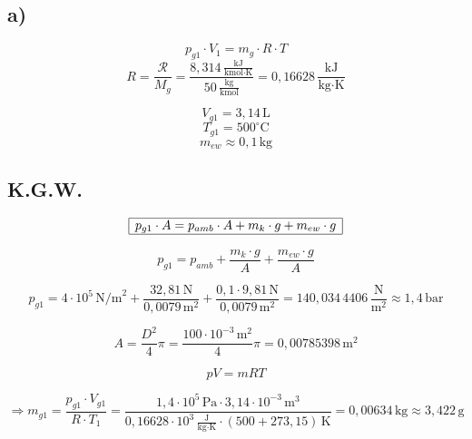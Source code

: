 

\subsection*{a)}
\[
p_{g1} \cdot V_1 = m_g \cdot R \cdot T
\]
\[
R = \frac{\mathcal{R}}{M_g} = \frac{8{,}314 \, \frac{\text{kJ}}{\text{kmol} \cdot \text{K}}}{50 \, \frac{\text{kg}}{\text{kmol}}} = 0{,}16628 \, \frac{\text{kJ}}{\text{kg} \cdot \text{K}}
\]

\[
V_{g1} = 3{,}14 \, \text{L}
\]
\[
T_{g1} = 500^\circ \text{C}
\]
\[
m_{ew} \approx 0{,}1 \, \text{kg}
\]

\subsection*{K.G.W.}
\[
\begin{array}{|c|}
\hline
p_{g1} \cdot A = p_{amb} \cdot A + m_k \cdot g + m_{ew} \cdot g \\
\hline
\end{array}
\]

\[
p_{g1} = p_{amb} + \frac{m_k \cdot g}{A} + \frac{m_{ew} \cdot g}{A}
\]

\[
p_{g1} = 4 \cdot 10^5 \, \text{N/m}^2 + \frac{32{,}81 \, \text{N}}{0{,}0079 \, \text{m}^2} + \frac{0{,}1 \cdot 9{,}81 \, \text{N}}{0{,}0079 \, \text{m}^2} = 140{,}034 \, 4406 \, \frac{\text{N}}{\text{m}^2} \approx 1{,}4 \, \text{bar}
\]

\[
A = \frac{D^2}{4} \pi = \frac{100 \cdot 10^{-3} \, \text{m}^2}{4} \pi = 0{,}00785398 \, \text{m}^2
\]

\[
pV = mRT
\]

\[
\Rightarrow m_{g1} = \frac{p_{g1} \cdot V_{g1}}{R \cdot T_1} = \frac{1{,}4 \cdot 10^5 \, \text{Pa} \cdot 3{,}14 \cdot 10^{-3} \, \text{m}^3}{0{,}16628 \cdot 10^3 \, \frac{\text{J}}{\text{kg} \cdot \text{K}} \cdot (500 + 273{,}15) \, \text{K}} = 0{,}00634 \, \text{kg} \approx 3{,}422 \, \text{g}
\]